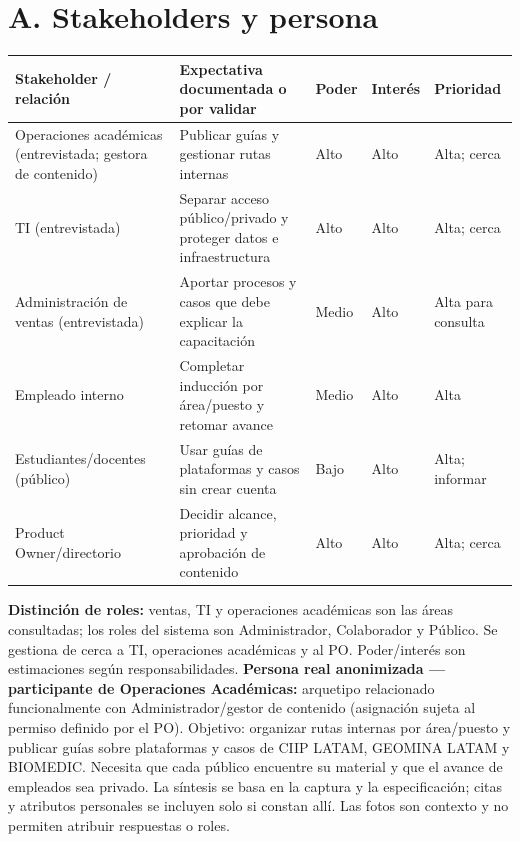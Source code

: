 \documentclass[10pt,a4paper]{extarticle}
\begin{document}
\section*{A. Stakeholders y persona}
\footnotesize
\begin{tabularx}{\linewidth}{P{2.8cm} Y P{1.5cm} P{1.5cm} P{1.5cm}}
\toprule
Stakeholder / relación & Expectativa documentada o por validar & Poder & Interés & Prioridad \\
\midrule
Operaciones académicas (entrevistada; gestora de contenido) & Publicar guías y gestionar rutas internas & Alto & Alto & Alta; cerca \\
\addlinespace[2pt]
TI (entrevistada) & Separar acceso público/privado y proteger datos e infraestructura & Alto & Alto & Alta; cerca \\
\addlinespace[2pt]
Administración de ventas (entrevistada) & Aportar procesos y casos que debe explicar la capacitación & Medio & Alto & Alta para consulta \\
\addlinespace[2pt]
Empleado interno & Completar inducción por área/puesto y retomar avance & Medio & Alto & Alta \\
\addlinespace[2pt]
Estudiantes/docentes (público) & Usar guías de plataformas y casos sin crear cuenta & Bajo & Alto & Alta; informar \\
\addlinespace[2pt]
Product Owner/directorio & Decidir alcance, prioridad y aprobación de contenido & Alto & Alto & Alta; cerca \\
\bottomrule
\end{tabularx}
\par
\normalsize
\vspace{8pt}
\noindent \textbf{Distinción de roles:} ventas, TI y operaciones académicas son las áreas consultadas; los roles del sistema son Administrador, Colaborador y Público. Se gestiona de cerca a TI, operaciones académicas y al PO. Poder/interés son estimaciones según responsabilidades. \textbf{Persona real anonimizada — participante de Operaciones Académicas:} arquetipo relacionado funcionalmente con Administrador/gestor de contenido (asignación sujeta al permiso definido por el PO). Objetivo: organizar rutas internas por área/puesto y publicar guías sobre plataformas y casos de CIIP LATAM, GEOMINA LATAM y BIOMEDIC. Necesita que cada público encuentre su material y que el avance de empleados sea privado. La síntesis se basa en la captura y la especificación; citas y atributos personales se incluyen solo si constan allí. Las fotos son contexto y no permiten atribuir respuestas o roles.
\end{document}
